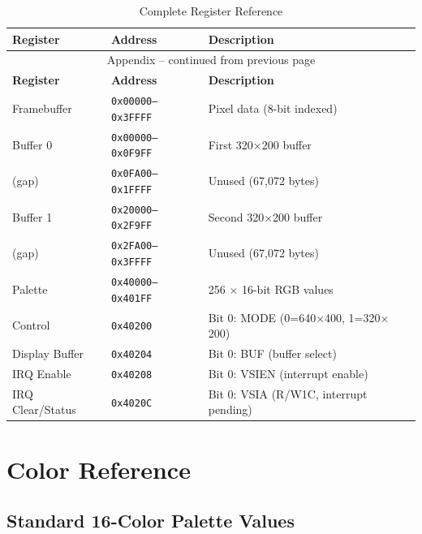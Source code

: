 \documentclass[11pt,letterpaper]{report}
\begin{document}
\begin{longtable}{p{3cm}p{2cm}p{7cm}}
\caption{Complete Register Reference}
\label{tab:reg_reference} \\
\toprule
\textbf{Register} & \textbf{Address} & \textbf{Description} \\
\midrule
\endfirsthead

\multicolumn{3}{c}{Appendix -- continued from previous page} \\
\toprule
\textbf{Register} & \textbf{Address} & \textbf{Description} \\
\midrule
\endhead

\bottomrule
\endfoot

\bottomrule
\endlastfoot

Framebuffer & \texttt{0x00000--0x3FFFF} & Pixel data (8-bit indexed) \\
Buffer 0 & \texttt{0x00000--0x0F9FF} & First 320$\times$200 buffer \\
(gap) & \texttt{0x0FA00--0x1FFFF} & Unused (67,072 bytes) \\
Buffer 1 & \texttt{0x20000--0x2F9FF} & Second 320$\times$200 buffer \\
(gap) & \texttt{0x2FA00--0x3FFFF} & Unused (67,072 bytes) \\
Palette & \texttt{0x40000--0x401FF} & 256 $\times$ 16-bit RGB values \\
Control & \texttt{0x40200} & Bit 0: MODE (0=640$\times$400, 1=320$\times$200) \\
Display Buffer & \texttt{0x40204} & Bit 0: BUF (buffer select) \\
IRQ Enable & \texttt{0x40208} & Bit 0: VSIEN (interrupt enable) \\
IRQ Clear/Status & \texttt{0x4020C} & Bit 0: VSIA (R/W1C, interrupt pending) \\
\end{longtable}

\section{Color Reference}

\subsection{Standard 16-Color Palette Values}
\end{document}
